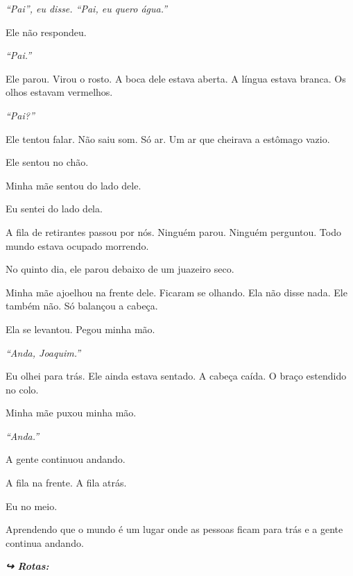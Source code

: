 \noindent \textit{\textquotedblleft{}Pai\textquotedblright{}\textit{, eu disse. }\textquotedblleft{}Pai, eu quero água.\textquotedblright{}}

\noindent Ele não respondeu.

\noindent \textit{\textquotedblleft{}Pai.\textquotedblright{}}

\noindent Ele parou. Virou o rosto. A boca dele estava aberta. A língua estava branca. Os olhos estavam vermelhos.

\noindent \textit{\textquotedblleft{}Pai?\textquotedblright{}}

\noindent Ele tentou falar. Não saiu som. Só ar. Um ar que cheirava a estômago vazio.

\noindent Ele sentou no chão.

\noindent Minha mãe sentou do lado dele.

\noindent Eu sentei do lado dela.

\noindent A fila de retirantes passou por nós. Ninguém parou. Ninguém perguntou. Todo mundo estava ocupado morrendo.

\noindent No quinto dia, ele parou debaixo de um juazeiro seco.

\noindent Minha mãe ajoelhou na frente dele. Ficaram se olhando. Ela não disse nada. Ele também não. Só balançou a cabeça.

\noindent Ela se levantou. Pegou minha mão.

\noindent \textit{\textquotedblleft{}Anda, Joaquim.\textquotedblright{}}

\noindent Eu olhei para trás. Ele ainda estava sentado. A cabeça caída. O braço estendido no colo.

\noindent Minha mãe puxou minha mão.

\noindent \textit{\textquotedblleft{}Anda.\textquotedblright{}}

\noindent A gente continuou andando.

\noindent A fila na frente. A fila atrás.

\noindent Eu no meio.

\noindent Aprendendo que o mundo é um lugar onde as pessoas ficam para trás e a gente continua andando.

\vspace{0.5em}
\noindent\textit{\textbf{↪ Rotas:}  \rotasep {} \rotasep {}}
